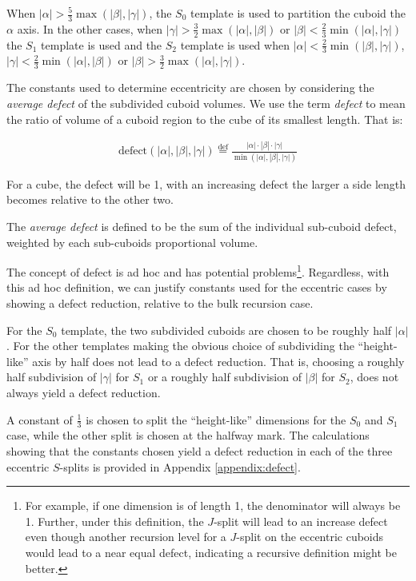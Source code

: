When $|\alpha| > \frac{5}{3} \max(|\beta|, |\gamma|)$, the $S_0$ template is used to partition the cuboid the $\alpha$ axis.
In the other cases, when $|\gamma| > \frac{3}{2} \max(|\alpha|, |\beta|)$ or $|\beta| < \frac{2}{3} \min(|\alpha|, |\gamma|)$ the $S_1$
template is used and the $S_2$ template is used when
$|\alpha| < \frac{2}{3} \min(|\beta|, |\gamma|)$,
$|\gamma| < \frac{2}{3} \min(|\alpha|, |\beta|)$ or
$|\beta| > \frac{3}{2} \max(|\alpha|, |\gamma|)$.

The constants used to determine eccentricity are chosen by considering the \textit{average defect} of the subdivided cuboid volumes.
We use the term \textit{defect} to mean the ratio of volume of a cuboid region to the cube of its smallest length.
That is:

$$
\begin{array}{l}
  \text{defect}(|\alpha|, |\beta|, |\gamma|) \overset{\mathrm{def}}{=} \frac{ |\alpha| \cdot |\beta| \cdot |\gamma| }{ \min(|\alpha|, |\beta|, |\gamma|) }
\end{array}
$$

For a cube, the defect will be 1, with an increasing defect the larger a side length becomes relative to the other two.

The \textit{average defect} is defined to be the sum of the individual sub-cuboid defect, weighted by each sub-cuboids proportional
volume.

The concept of defect is ad hoc and has potential problems\footnote{For example,
if one dimension is of length 1, the denominator will always be 1.
Further, under this definition, the $J$-split will lead to an increase defect even though another recursion level for a $J$-split on the eccentric
cuboids would lead to a near equal defect, indicating a recursive definition might be better.}.
Regardless, with this ad hoc definition, we can justify constants used for the eccentric cases by showing a defect reduction, relative
to the bulk recursion case.

For the $S_0$ template, the two subdivided cuboids are chosen to be roughly half $|\alpha|$.
For the other templates making the obvious choice of subdividing the ``height-like'' axis by half does
not lead to a defect reduction.
That is, choosing a roughly half subdivision of $|\gamma|$ for $S_1$ or a roughly half subdivision of $|\beta|$ for $S_2$, does
not always yield a defect reduction.

A constant of $\frac{1}{3}$ is chosen to split the ``height-like'' dimensions for the $S_0$ and $S_1$ case,
while the other split is chosen at the halfway mark.
The calculations showing that the constants chosen yield a defect reduction in each of the three eccentric $S$-splits is provided in Appendix \ref{appendix:defect}.

